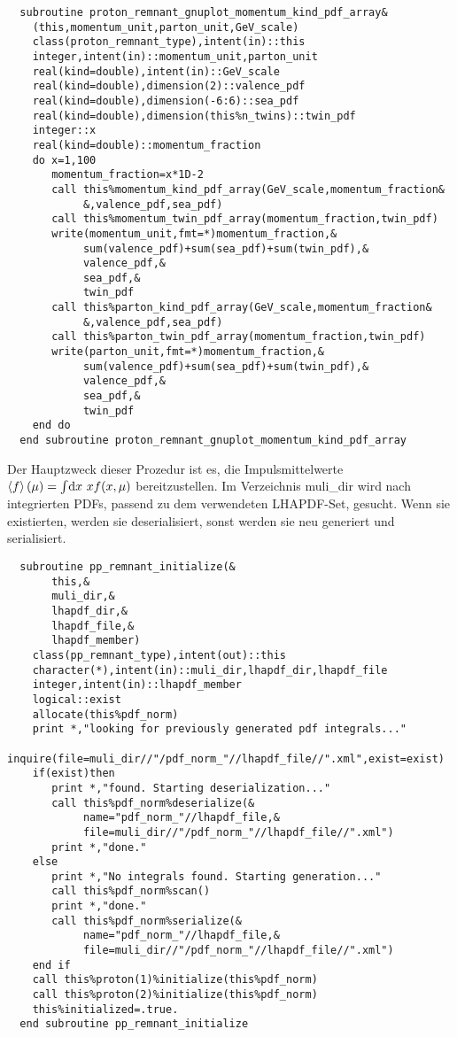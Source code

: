 \begin{Verbatim}
  subroutine proton_remnant_gnuplot_momentum_kind_pdf_array&
    (this,momentum_unit,parton_unit,GeV_scale)
    class(proton_remnant_type),intent(in)::this
    integer,intent(in)::momentum_unit,parton_unit
    real(kind=double),intent(in)::GeV_scale
    real(kind=double),dimension(2)::valence_pdf
    real(kind=double),dimension(-6:6)::sea_pdf
    real(kind=double),dimension(this%n_twins)::twin_pdf
    integer::x
    real(kind=double)::momentum_fraction
    do x=1,100
       momentum_fraction=x*1D-2
       call this%momentum_kind_pdf_array(GeV_scale,momentum_fraction&
            &,valence_pdf,sea_pdf)
       call this%momentum_twin_pdf_array(momentum_fraction,twin_pdf)
       write(momentum_unit,fmt=*)momentum_fraction,&
            sum(valence_pdf)+sum(sea_pdf)+sum(twin_pdf),&
            valence_pdf,&
            sea_pdf,&
            twin_pdf
       call this%parton_kind_pdf_array(GeV_scale,momentum_fraction&
            &,valence_pdf,sea_pdf)
       call this%parton_twin_pdf_array(momentum_fraction,twin_pdf)
       write(parton_unit,fmt=*)momentum_fraction,&
            sum(valence_pdf)+sum(sea_pdf)+sum(twin_pdf),&
            valence_pdf,&
            sea_pdf,&
            twin_pdf       
    end do
  end subroutine proton_remnant_gnuplot_momentum_kind_pdf_array
\end{Verbatim}
Der Hauptzweck dieser Prozedur ist es, die Impulsmittelwerte $\left<f\right>(\mu)=\int\!\operatorname{d}\!x\ x f(x,\mu)$
 bereitzustellen. Im Verzeichnis muli\_dir wird nach integrierten PDFs, passend zu dem verwendeten LHAPDF-Set, gesucht. Wenn sie existierten, werden sie deserialisiert, sonst werden sie neu generiert und serialisiert.
\begin{Verbatim}
  subroutine pp_remnant_initialize(&
       this,&
       muli_dir,&
       lhapdf_dir,&
       lhapdf_file,&
       lhapdf_member)
    class(pp_remnant_type),intent(out)::this
    character(*),intent(in)::muli_dir,lhapdf_dir,lhapdf_file
    integer,intent(in)::lhapdf_member
    logical::exist
    allocate(this%pdf_norm)
    print *,"looking for previously generated pdf integrals..."
    inquire(file=muli_dir//"/pdf_norm_"//lhapdf_file//".xml",exist=exist)
    if(exist)then
       print *,"found. Starting deserialization..."
       call this%pdf_norm%deserialize(&
            name="pdf_norm_"//lhapdf_file,&
            file=muli_dir//"/pdf_norm_"//lhapdf_file//".xml")
       print *,"done."
    else
       print *,"No integrals found. Starting generation..."
       call this%pdf_norm%scan()
       print *,"done."
       call this%pdf_norm%serialize(&
            name="pdf_norm_"//lhapdf_file,&
            file=muli_dir//"/pdf_norm_"//lhapdf_file//".xml")
    end if
    call this%proton(1)%initialize(this%pdf_norm)
    call this%proton(2)%initialize(this%pdf_norm)
    this%initialized=.true.
  end subroutine pp_remnant_initialize
\end{Verbatim}
